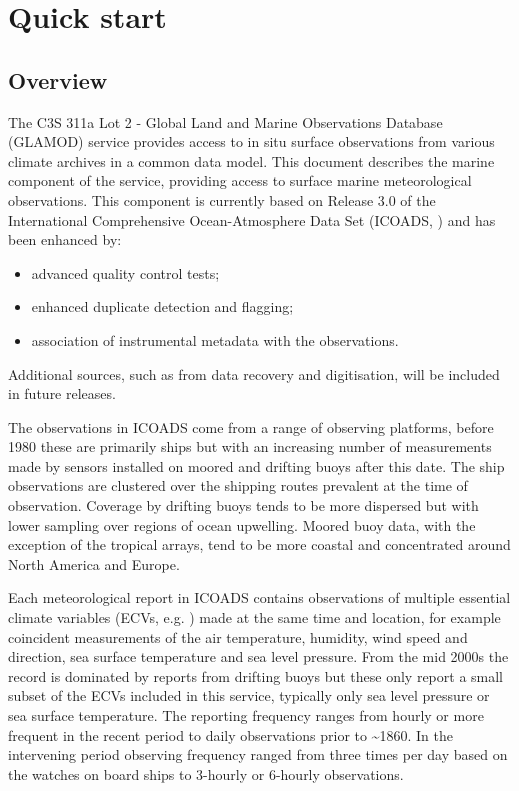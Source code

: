 \section{Quick start}
\subsection{Overview}
The C3S 311a Lot 2 - Global Land and Marine Observations Database (GLAMOD) service provides access to in situ surface observations from various climate archives in a common data model.
This document describes the marine component of the service, providing access to surface marine meteorological observations.
This component is currently based on Release 3.0 of the International Comprehensive Ocean-Atmosphere Data Set (ICOADS, \cite{Freeman2017}) and has been enhanced by: 
\begin{itemize}
\item advanced quality control tests; 
\item enhanced duplicate detection and flagging; 
\item association of instrumental metadata with the observations. 
\end{itemize}
Additional sources, such as from data recovery and digitisation, will be included in future releases.

The observations in ICOADS come from a range of observing platforms, before 1980 these are primarily ships but with an increasing number of measurements made by sensors installed on moored and drifting buoys after this date. 
The ship observations are clustered over the shipping routes prevalent at the time of observation. 
Coverage by drifting buoys tends to be more dispersed but with lower sampling over regions of ocean upwelling. 
Moored buoy data, with the exception of the tropical arrays, tend to be more coastal and concentrated around North America and Europe.

Each meteorological report in ICOADS contains observations of multiple essential climate variables (ECVs, e.g. \cite{Bojinski2014}) made at the same time and location, for example coincident measurements of the air temperature, humidity, wind speed and direction, sea surface temperature and sea level pressure.
From the mid 2000s the record is dominated by reports from drifting buoys but these only report a small subset of the ECVs included in this service, typically only sea level pressure or sea surface temperature. 
The reporting frequency ranges from hourly or more frequent in the recent period to daily observations prior to \sim 1860. 
In the intervening period observing frequency ranged from three times per day based on the watches on board ships to 3-hourly or 6-hourly observations.


